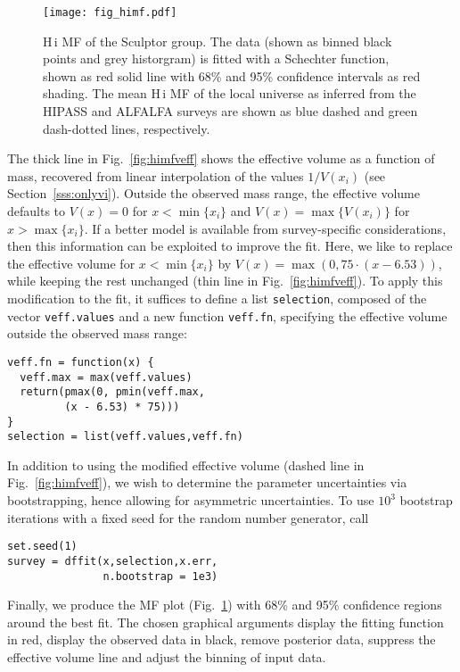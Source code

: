 \documentclass[a4paper,fleqn,usenatbib]{mnras}
\newcommand{\veff}{V}%
\newcommand{\fig}[1]{Fig.~\ref{fig:#1}}
\newcommand{\ha}{H{\sc\,i}\xspace}
\begin{document}
\begin{figure}
\begin{center}
\texttt{[image: fig\_himf.pdf]}\vspace{-4mm}
\caption{\ha MF of the Sculptor group. The data (shown as binned black points and grey historgram) is fitted with a Schechter function, shown as red solid line with 68\% and 95\% confidence intervals as red shading. The mean \ha MF of the local universe as inferred from the HIPASS and ALFALFA surveys are shown as blue dashed and green dash-dotted lines, respectively.}\label{fig:himf}
\end{center}
\end{figure}

The thick line in \fig{himfveff} shows the effective volume as a function of mass, recovered from linear interpolation of the values $1/\veff(x_i)$ (see Section~\ref{sss:onlyvi}). Outside the observed mass range, the effective volume defaults to $\veff(x)=0$ for $x<\min\{x_i\}$ and $\veff(x)=\max\{\veff(x_i)\}$ for $x>\max\{x_i\}$. If a better model is available from survey-specific considerations, then this information can be exploited to improve the fit. Here, we like to replace the effective volume for $x<\min\{x_i\}$ by $\veff(x)=\max(0,75\cdot(x-6.53))$, while keeping the rest unchanged (thin line in \fig{himfveff}). To apply this modification to the fit, it suffices to define a list \texttt{selection}, composed of the vector \texttt{veff.values} and a new function \texttt{veff.fn}, specifying the effective volume outside the observed mass range:
%
{\color{blue}\begin{lstlisting}
veff.fn = function(x) {
  veff.max = max(veff.values)
  return(pmax(0, pmin(veff.max,
         (x - 6.53) * 75)))
}
selection = list(veff.values,veff.fn)
\end{lstlisting}}
%
\noindent In addition to using the modified effective volume (dashed line in \fig{himfveff}), we wish to determine the parameter uncertainties via bootstrapping, hence allowing for asymmetric uncertainties. To use $10^3$ bootstrap iterations with a fixed seed for the random number generator, call
%
{\color{blue}\begin{lstlisting}
set.seed(1)
survey = dffit(x,selection,x.err,
               n.bootstrap = 1e3)
\end{lstlisting}}
%
\noindent Finally, we produce the MF plot (\fig{himf}) with 68\% and 95\% confidence regions around the best fit. The chosen graphical arguments display the fitting function in red, display the observed data in black, remove posterior data, suppress the effective volume line and adjust the binning of input data.
\end{document}
